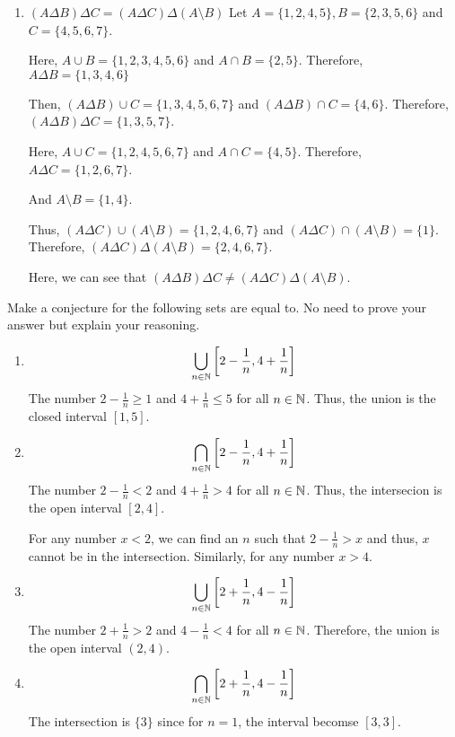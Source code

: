 \begin{enumerate}
	\item $(A \Delta B) \Delta C = (A \Delta C) \Delta (A \setminus B)$
		\bs
		Let $A = \{1, 2, 4, 5\}, B = \{2, 3, 5, 6\}$ and $C = \{ 4, 5, 6, 7 \}$.
		
		Here, $A \cup B = \{1, 2, 3, 4, 5, 6\}$ and $A \cap B = \{2, 5\}$. Therefore, $A \Delta B = \{1, 3, 4, 6\}$

		Then, $(A \Delta B) \cup C = \{1, 3, 4, 5, 6, 7 \}$ and $(A \Delta B) \cap C = \{4, 6\}$. Therefore, $(A \Delta B) \Delta C = \{1, 3, 5, 7\}$.

		Here, $A \cup C = \{1, 2, 4, 5, 6, 7\}$ and $A \cap C = \{4, 5\}$. Therefore, $A \Delta C = \{1, 2, 6, 7\}$.

		And $A \setminus B = \{1, 4\}$.

		Thus, $(A \Delta C) \cup (A \setminus B) = \{1, 2, 4, 6, 7\}$ and $(A \Delta C) \cap (A \setminus B) = \{1\}$. Therefore, $(A \Delta C) \Delta (A \setminus B) = \{2, 4, 6, 7\}$.

		Here, we can see that $(A \Delta B) \Delta C \neq (A \Delta C) \Delta (A \setminus B)$.
		\es

\end{enumerate}
\ep

\bp
Make a conjecture for the following sets are equal to. No need to prove your answer but explain your reasoning.
\begin{enumerate}

	\item
	      $$\bigcup_{n \in \mathbb{N}} \left[ 2 - \frac{1}{n}, 4 + \frac{1}{n} \right]$$
	      \bs
	      The number $2 - \frac{1}{n} \geq 1$ and $4 + \frac{1}{n} \leq 5$ for all $n \in \mathbb{N}$. Thus, the union is the closed interval $[1, 5]$.
	      \es


	\item
	      $$\bigcap_{n \in \mathbb{N}} \left[ 2 - \frac{1}{n}, 4 + \frac{1}{n} \right]$$
	      \bs
	      The number $2 - \frac{1}{n} < 2$ and $4 + \frac{1}{n} > 4$ for all $n \in \mathbb{N}$. Thus, the intersecion is the open interval $[2, 4]$.

	      For any number $x < 2$, we can find an $n$ such that $2 - \frac{1}{n} > x$ and thus, $x$ cannot be in the intersection. Similarly, for any number $x > 4$.
	      \es

	\item $$\bigcup_{n \in \mathbb{N}} \left[ 2 + \frac{1}{n}, 4 - \frac{1}{n} \right]$$
	      \bs
	      The number $2 + \frac{1}{n} > 2$ and $4 - \frac{1}{n} < 4$ for all $n \in \mathbb{N}$. Therefore, the union is the open interval $(2, 4)$.
	      \es


	\item $$\bigcap_{n \in \mathbb{N}} \left[ 2 + \frac{1}{n}, 4 - \frac{1}{n} \right]$$
	      \bs The intersection is $\{3\}$ since for $n = 1$, the interval becomse $[3,3]$. \es

\end{enumerate}
\ep

